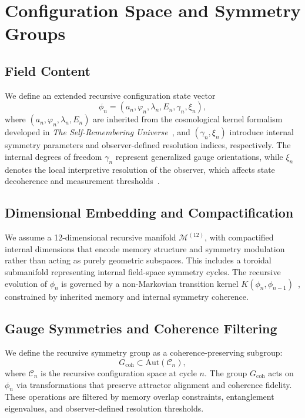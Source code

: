 \section{Configuration Space and Symmetry Groups}

\subsection{Field Content}

We define an extended recursive configuration state vector
\[
\phi_n = \left( a_n, \varphi_n, \lambda_n, E_n, \gamma_n, \xi_n \right),
\]
where $(a_n, \varphi_n, \lambda_n, E_n)$ are inherited from the cosmological kernel formalism developed in \textit{The Self-Remembering Universe}~\cite{parian2025selfrememberingI}, and $(\gamma_n, \xi_n)$ introduce internal symmetry parameters and observer-defined resolution indices, respectively. The internal degrees of freedom $\gamma_n$ represent generalized gauge orientations, while $\xi_n$ denotes the local interpretive resolution of the observer, which affects state decoherence and measurement thresholds~\cite{zurek2003decoherence, nielsen2010quantum}.

\subsection{Dimensional Embedding and Compactification}

We assume a 12-dimensional recursive manifold $\mathcal{M}^{(12)}$, with compactified internal dimensions that encode memory structure and symmetry modulation rather than acting as purely geometric subspaces. This includes a toroidal submanifold representing internal field-space symmetry cycles. The recursive evolution of $\phi_n$ is governed by a non-Markovian transition kernel $K(\phi_{n}, \phi_{n-1})$~\cite{ashtekar2006quantum}, constrained by inherited memory and internal symmetry coherence.

\subsection{Gauge Symmetries and Coherence Filtering}

We define the recursive symmetry group as a coherence-preserving subgroup:
\[
G_{\text{coh}} \subset \mathrm{Aut}(\mathcal{C}_n),
\]
where $\mathcal{C}_n$ is the recursive configuration space at cycle $n$. The group $G_{\text{coh}}$ acts on $\phi_n$ via transformations that preserve attractor alignment and coherence fidelity. These operations are filtered by memory overlap constraints, entanglement eigenvalues, and observer-defined resolution thresholds.

